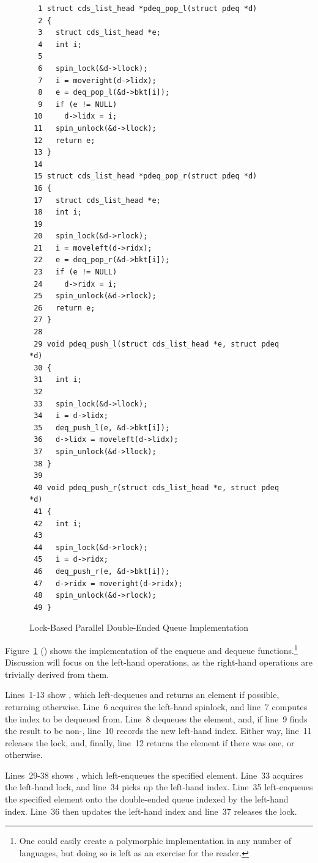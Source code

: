 \begin{figure}[bp]
{ \scriptsize
\begin{verbatim}
  1 struct cds_list_head *pdeq_pop_l(struct pdeq *d)
  2 {
  3   struct cds_list_head *e;
  4   int i;
  5 
  6   spin_lock(&d->llock);
  7   i = moveright(d->lidx);
  8   e = deq_pop_l(&d->bkt[i]);
  9   if (e != NULL)
 10     d->lidx = i;
 11   spin_unlock(&d->llock);
 12   return e;
 13 }
 14 
 15 struct cds_list_head *pdeq_pop_r(struct pdeq *d)
 16 {
 17   struct cds_list_head *e;
 18   int i;
 19 
 20   spin_lock(&d->rlock);
 21   i = moveleft(d->ridx);
 22   e = deq_pop_r(&d->bkt[i]);
 23   if (e != NULL)
 24     d->ridx = i;
 25   spin_unlock(&d->rlock);
 26   return e;
 27 }
 28 
 29 void pdeq_push_l(struct cds_list_head *e, struct pdeq *d)
 30 {
 31   int i;
 32 
 33   spin_lock(&d->llock);
 34   i = d->lidx;
 35   deq_push_l(e, &d->bkt[i]);
 36   d->lidx = moveleft(d->lidx);
 37   spin_unlock(&d->llock);
 38 }
 39 
 40 void pdeq_push_r(struct cds_list_head *e, struct pdeq *d)
 41 {
 42   int i;
 43 
 44   spin_lock(&d->rlock);
 45   i = d->ridx;
 46   deq_push_r(e, &d->bkt[i]);
 47   d->ridx = moveright(d->ridx);
 48   spin_unlock(&d->rlock);
 49 }
\end{verbatim}
}
\caption{Lock-Based Parallel Double-Ended Queue Implementation}
\label{fig:SMPdesign:Lock-Based Parallel Double-Ended Queue Implementation}
\end{figure}

Figure~\ref{fig:SMPdesign:Lock-Based Parallel Double-Ended Queue Implementation}
() 
shows the implementation of the enqueue and dequeue functions.\footnote{
	One could easily create a polymorphic implementation in any
	number of languages, but doing so is left as an exercise for
	the reader.}
Discussion will focus on the left-hand operations, as the right-hand
operations are trivially derived from them.

Lines~1-13 show , which left-dequeues and returns
an element if possible, returning  otherwise.
Line~6 acquires the left-hand spinlock, and line~7 computes the
index to be dequeued from.
Line~8 dequeues the element, and, if line~9 finds the result to be
non-, line~10 records the new left-hand index.
Either way, line~11 releases the lock, and, finally, line~12 returns
the element if there was one, or  otherwise.

Lines~29-38 shows , which left-enqueues the specified
element.
Line~33 acquires the left-hand lock, and line~34 picks up the left-hand
index.
Line~35 left-enqueues the specified element onto the double-ended queue
indexed by the left-hand index.
Line~36 then updates the left-hand index and line~37 releases the lock.

